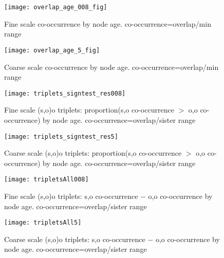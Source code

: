 \documentclass[12pt,letterpaper]{article}
\begin{document}
\begin{figure}[h!]
 \caption{Fine scale co-occurrence by node age. co-occurrence=overlap/min range}
 \centering
 \texttt{[image: overlap\_age\_008\_fig]}
\end{figure}

\begin{figure}[h!]
\centering
\caption{Coarse scale co-occurrence by node age. co-occurrence=overlap/min range}
\texttt{[image: overlap\_age\_5\_fig]}
\end{figure}

\begin{figure}[h!]
 \caption{Fine scale (s,o)o triplets: proportion(s,o co-occurrence $>$ o,o co-occurrence) by node age. co-occurrence=overlap/sister range}
 \centering
 \texttt{[image: triplets\_signtest\_res008]}
\end{figure}

\begin{figure}[h!]
\centering
\caption{Coarse scale (s,o)o triplets: proportion(s,o co-occurrence $>$ o,o co-occurrence) by node age. co-occurrence=overlap/sister range}
\texttt{[image: triplets\_signtest\_res5]}
\end{figure}

\begin{figure}[h!]
 \caption{Fine scale (s,o)o triplets: s,o co-occurrence $-$ o,o co-occurrence by node age. co-occurrence=overlap/sister range}
 \centering
 \texttt{[image: tripletsAll008]}
\end{figure}

\begin{figure}[h!]
\centering
\caption{Coarse scale (s,o)o triplets: s,o co-occurrence $-$ o,o co-occurrence by node age. co-occurrence=overlap/sister range}
\texttt{[image: tripletsAll5]}
\end{figure}
\end{document}
